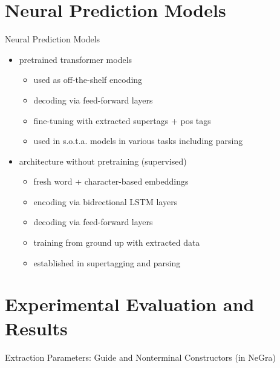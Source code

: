 \documentclass[aspectratio=169, 10pt]{beamer}
\begin{document}
    \section{Neural Prediction Models}
    \begin{frame}{Neural Prediction Models}
            \begin{itemize}
                \item<+-> pretrained transformer models \citep[semi-supervised;][]{vaswani2017attention, Devlin2019}
                \begin{itemize}
                    \item used as off-the-shelf encoding
                    \item decoding via feed-forward layers
                    \item fine-tuning with extracted supertags + pos tags
                    \item used in s.o.t.a. models in various tasks including parsing \citep{Cor20, FerGom22,Coa21, Sun22}
                \end{itemize}
                \item<+-> architecture without pretraining (supervised)
                \begin{itemize}
                    \item fresh word + character-based embeddings
                    \item encoding via bidrectional LSTM \citep{Hoc97} layers
                    \item decoding via feed-forward layers
                    \item training from ground up with extracted data
                    \item established in supertagging and parsing \citep{vaswani2016supertagging, Cor20, StaSte20}
                \end{itemize}
            \end{itemize}
    \end{frame}


    \section{Experimental Evaluation and Results}
    \begin{frame}{Extraction Parameters: Guide and Nonterminal Constructors (in NeGra)}
        
    \end{frame}
\end{document}
